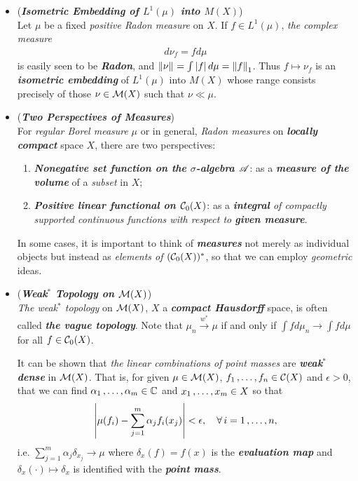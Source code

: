 \documentclass[11pt]{article}
\begin{document}
\begin{itemize}
\item \begin{remark} (\emph{\textbf{Isometric Embedding of $L^1(\mu)$ into $M(X)$}})\\
Let $\mu$ be a fixed \emph{positive Radon measure} on $X$. If $f \in L^1(\mu)$, \emph{the complex measure}
\begin{align*}
d\nu_f = f d\mu 
\end{align*}
is easily seen to be \emph{\textbf{Radon}}, and $\left\|\nu\right\|_{} = \int \left\lvert f \right\rvert d\mu = \left\|f\right\|_{1}$.
Thus $f \mapsto \nu_f$ is an \emph{\textbf{isometric embedding}} of $L^1(\mu)$ into $M(X)$ whose range consists precisely of those $\nu \in {\mathcal M}(X)$ such that $\nu \ll \mu$. 
\end{remark}

\item \begin{remark} (\emph{\textbf{Two Perspectives of Measures}})\\
For \emph{regular Borel measure} $\mu$ or in general, \emph{Radon measures} on \emph{\textbf{locally compact}} space $X$, there are two perspectives:
\begin{enumerate}
\item \emph{\textbf{Nonegative set function on the $\sigma$-algebra ${\mathscr A}$}}: as a \emph{\textbf{measure of the volume}} of a \emph{subset} in $X$;
\item \emph{\textbf{Positive linear functional on ${\mathcal C}_0(X)$}}: as a \emph{\textbf{integral} of compactly supported continuous functions with respect to \textbf{given measure}}.
\end{enumerate}
In some cases, it is important to think of \emph{\textbf{measures}} not merely as individual  objects but instead as \emph{elements of $({\mathcal C}_{0}(X))^{*}$}, so that we can employ \emph{geometric} ideas. 
\end{remark}


\item \begin{remark} (\emph{\textbf{Weak$^{*}$ Topology on ${\mathcal M}(X)$}})\\
\emph{The weak$^{*}$ topology} on ${\mathcal M}(X)$, $X$ a \emph{\textbf{compact Hausdorff}} space, is often called \emph{\textbf{the vague topology}}. Note that $\mu_n \stackrel{w^{*}}{\rightarrow} \mu$ if and only if $\int f d\mu_n \rightarrow \int f d\mu$ for all $f \in {\mathcal C}_0(X)$.

It can be shown that \emph{the linear combinations of point masses} are \emph{\textbf{weak$^{*}$ dense}} in  ${\mathcal M}(X)$. That is, for given $\mu \in {\mathcal M}(X)$,  $f_1 \,{,}\ldots{,}\, f_n \in {\mathcal C}(X)$ and $\epsilon > 0$, that we can find $\alpha_1 \,{,}\ldots{,}\, \alpha_m \in {\mathbb C}$ and $x_1 \,{,}\ldots{,}\, x_m \in X$ so that 
\begin{align*}
\left\lvert \mu(f_i) - \sum_{j=1}^{m}\alpha_j f_{i}(x_j)  \right\rvert < \epsilon, \quad \forall\, i=1 \,{,}\ldots{,}\, n,
\end{align*} i.e. $\sum_{j=1}^{m}\alpha_j \delta_{x_j} \rightarrow \mu$ where $\delta_x(f) = f(x)$ is the \emph{\textbf{evaluation map}} and $\delta_x(\cdot) \mapsto \delta_x$ is identified with the \emph{\textbf{point mass}}.
\end{remark}


\end{itemize}
\end{document}
